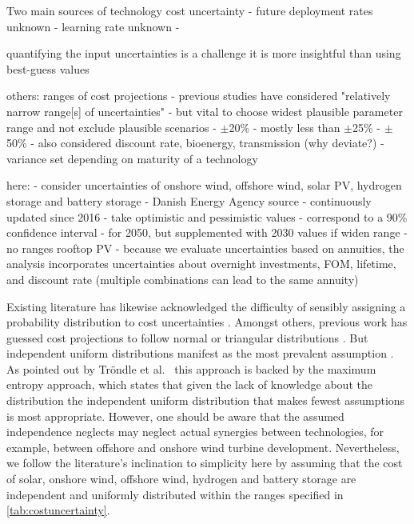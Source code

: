 
Two main sources of technology cost uncertainty
- future deployment rates unknown
- learning rate unknown
- \cite{gritsevskyi_modeling_2000,heuberger_power_2017,yeh_review_2012,mattsson_learning_2019}

quantifying the input uncertainties is a challenge \cite{moret_characterization_2017}
it is more insightful than using best-guess values \cite{fraiture_robustness_2020}


others: ranges of cost projections
- previous studies have considered "relatively narrow range[s] of uncertainties" \cite{Li2017}
- but vital to choose widest plausible parameter range and not exclude plausible scenarios \cite{moret_characterization_2017,mccollum_energy_2020}
- $\pm$20\% \cite{moret_characterization_2017}
- mostly less than $\pm$25\% \cite{pizarro-alonso_uncertainties_2019}
- $\pm$50\% \cite{shirizadeh_how_2019}
- \cite{trondle_trade-offs_2020} also considered discount rate, bioenergy, transmission (why deviate?)
- variance set depending on maturity of a technology \cite{li_using_2020}

here: 
- consider uncertainties of onshore wind, offshore wind, solar PV, hydrogen storage and battery storage
- Danish Energy Agency source
- continuously updated since 2016
- take optimistic and pessimistic values
- correspond to a 90\% confidence interval \cite{}
- for 2050, but supplemented with 2030 values if widen range
- no ranges rooftop PV
- because we evaluate uncertainties based on annuities,
  the analysis incorporates uncertainties about
  overnight investments, FOM, lifetime, and discount rate
  (multiple combinations can lead to the same annuity)


Existing literature has likewise acknowledged the difficulty of sensibly assigning
a probability distribution to cost uncertainties \cite{moret_robust_2016}.
Amongst others, previous work has guessed cost projections
to follow normal \cite{mavromatidis_uncertainty_2018} or triangular distributions \cite{li_using_2020}.
But independent uniform distributions manifest as the most prevalent assumption \cite{moret_characterization_2017,moret_robust_2016,shirizadeh_how_2019,trondle_trade-offs_2020,pilpola_analyzing_2020,Li2017,Trutnevyte2013,lopion_cost_2019}.
As pointed out by Tröndle et al.~\cite{trondle_trade-offs_2020} this approach is backed by the maximum entropy approach, which states that given the lack of knowledge about the distribution
the independent uniform distribution that makes fewest assumptions is most appropriate.
However, one should be aware that the assumed independence neglects may neglect actual synergies between technologies, for example, between offshore and onshore wind turbine development.
Nevertheless, we follow the literature's inclination to simplicity here by assuming
that the cost of solar, onshore wind, offshore wind, hydrogen and battery storage are independent and uniformly distributed within the ranges specified in \cref{tab:costuncertainty}.

